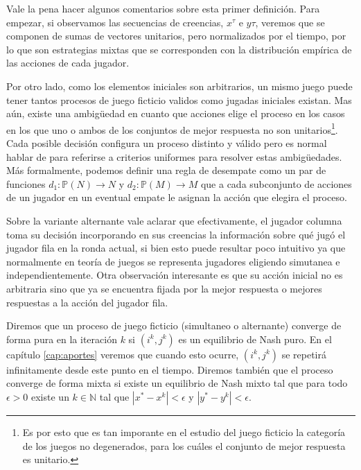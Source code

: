 Vale la pena hacer algunos comentarios sobre esta primer definición. Para empezar, si observamos las secuencias de creencias, $x^\tau$ e $y\tau$, veremos que se componen de sumas de vectores unitarios, pero normalizados por el tiempo, por lo que son estrategias mixtas que se corresponden con la distribución empírica de las acciones de cada jugador.

Por otro lado, como los elementos iniciales son arbitrarios, un mismo juego puede tener tantos procesos de juego ficticio validos como jugadas iniciales existan. Mas aún, existe una ambigüedad en cuanto que acciones elige el proceso en los casos en los que uno o ambos de los conjuntos de mejor respuesta no son unitarios\footnote{Es por esto que es tan imporante en el estudio del juego ficticio la categoría de los juegos no degenerados, para los cuáles el conjunto de mejor respuesta es unitario.}. Cada posible decisión configura un proceso distinto y válido pero es normal hablar de  para referirse a criterios uniformes para resolver estas ambigüedades. Más formalmente, podemos definir una regla de desempate como un par de funciones $d_1: \mathbb{P}(N) \rightarrow N$ y $d_2: \mathbb{P}(M) \rightarrow M$ que a cada subconjunto de acciones de un jugador en un eventual empate le asignan la acción que elegira el proceso.

Sobre la variante alternante vale aclarar que efectivamente, el jugador columna toma su decisión incorporando en sus creencias la información sobre qué jugó el jugador fila en la ronda actual, si bien esto puede resultar poco intuitivo ya que normalmente en teoría de juegos se representa jugadores eligiendo simutanea e independientemente. Otra observación interesante es que su acción inicial no es arbitraria sino que ya se encuentra fijada por la mejor respuesta o mejores respuestas a la acción del jugador fila.

Diremos que un proceso de juego ficticio (simultaneo o alternante) converge de forma pura en la iteración $k$ si $(i^k, j^k)$ es un equilibrio de Nash puro. En el capítulo \ref{cap:aportes} veremos que cuando esto ocurre, $(i^k, j^k)$ se repetirá infinitamente desde este punto en el tiempo. Diremos también que el proceso converge de forma mixta si existe un equilibrio de Nash mixto tal que para todo $\epsilon > 0$ existe un $k \in \mathbb{N}$ tal que $|x^* - x^k| < \epsilon$ y $|y^* - y^k| < \epsilon$.


